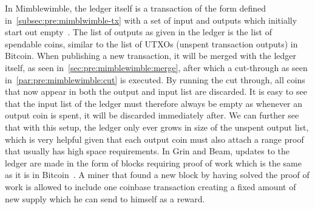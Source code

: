 In Mimblewimble, the ledger itself is a transaction of the form defined in~\cref{subsec:pre:mimblwimble-tx} with a set of input and outputs which initially start out empty~\cite{fuchsbauer2019aggregate}.
The list of outputs as given in the ledger is the list of spendable coins, similar to the list of UTXOs (unspent transaction outputs) in Bitcoin.
When publishing a new transaction, it will be merged with the ledger itself, as seen in~\cref{sec:pre:mimblewimble:merge}, after which a cut-through as seen in~\cref{par:pre:mimblewimble:cut} is executed.
By running the cut through, all coins that now appear in both the output and input list are discarded.
It is easy to see that the input list of the ledger must therefore always be empty as whenever an output coin is spent, it will be discarded immediately after.
We can further see that with this setup, the ledger only ever grows in size of the unspent output list, which is very helpful given that each output coin must also attach a range proof that usually has high space requirements.
In Grin and Beam, updates to the ledger are made in the form of blocks requiring proof of work which is the same as it is in Bitcoin~\cite{antonopoulos2014mastering}.
A miner that found a new block by having solved the proof of work is allowed to include one coinbase transaction creating a fixed amount of new supply which he can send to himself as a reward.